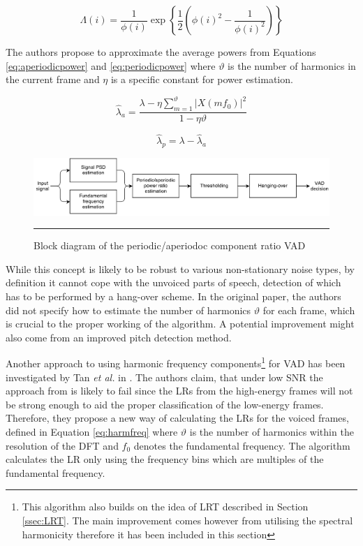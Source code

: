 \begin{equation}
\Lambda(i) = \frac{1}{\phi (i)} \exp \left\{ \frac{1}{2} \left( \phi (i)^{2} - \frac{1}{\phi (i)^{2}} \right) \right\}
\label{eq:PARADE}
\end{equation}

The authors propose to approximate the average powers from Equations \ref{eq:aperiodicpower} and \ref{eq:periodicpower} where $\vartheta$ is the number of harmonics in the current frame and $\eta$ is a specific constant for power estimation.

\begin{equation}
\hat{\lambda}_a = \frac{\lambda - \eta \sum_{m=1}^{\vartheta} \left| X(m f_0) \right|^{2}}{1-\eta \vartheta}
\label{eq:aperiodicpower}
\end{equation}

\begin{equation}
\hat{\lambda}_p = \lambda - \hat{\lambda}_a
\label{eq:periodicpower}
\end{equation}

\begin{figure}[htbp]
	\centering
		\includegraphics[width=0.9\columnwidth]{Figures/Chapter2/PARADE.png}
		\rule{37em}{0.5pt}
	\caption[Block diagram of the periodic/aperiodoc component ratio VAD]{Block diagram of the periodic/aperiodoc component ratio VAD \cite{PARADE}}
	\label{fig:PARADE}
\end{figure}

While this concept is likely to be robust to various non-stationary noise types, by definition it cannot cope with the unvoiced parts of speech, detection of which has to be performed by a hang-over scheme. In the original paper, the authors did not specify how to estimate the number of harmonics $\vartheta$ for each frame, which is crucial to the proper working of the algorithm. A potential improvement might also come from an improved pitch detection method.

Another approach to using harmonic frequency components\footnote{This algorithm also builds on the idea of LRT described in Section \ref{ssec:LRT}. The main improvement comes however from utilising the spectral harmonicity therefore it has been included in this section} for VAD has been investigated by Tan \emph{et al.} in \cite{Tan}. The authors claim, that under low SNR the approach from \cite{RamirezMulti} is likely to fail since the LRs from the high-energy frames will not be strong enough to aid the proper classification of the low-energy frames. Therefore, they propose a new way of calculating the LRs for the voiced frames, defined in Equation \ref{eq:harmfreq} where $\vartheta$ is the number of harmonics within the resolution of the DFT and $f_0$ denotes the fundamental frequency. The algorithm calculates the LR only using the frequency bins which are multiples of the fundamental frequency.

